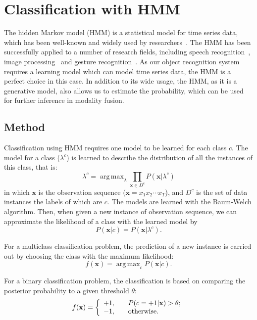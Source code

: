 \documentclass[letterpaper, 10 pt, conference]{ieeeconf}
\DeclareMathOperator*{\argmax}{arg\,max}
\begin{document}
\section{Classification with HMM}
The hidden Markov model (HMM) is a statistical model for time series data, which has been well-known and widely used by researchers~\cite{rabiner_tutorial_1989}\cite{rabiner_fundamentals_1993}. The HMM has been successfully applied to a number of research fields, including speech recognition~\cite{rabiner_fundamentals_1993}\cite{baker_dragon_1975}, image processing~\cite{chen_off-line_1994} and gesture recognition~\cite{mitra_gesture_2007}. As our object recognition system requires a learning model which can model time series data, the HMM is a perfect choice in this case. In addition to its wide usage, the HMM, as it is a generative model, also allows us to estimate the probability, which can be used for further inference in modality fusion.

\subsection{Method}
Classification using HMM requires one model to be learned for each class $c$. The model for a class ($\lambda^c$) is learned to describe the distribution of all the instances of this class, that is:
\begin{equation}
  \lambda^c = \argmax_{\lambda} \prod_{\mathbf{x} \in D^c} P(\mathbf{x}|\lambda^c)
\end{equation}
in which $\mathbf{x}$ is the observation sequence ($\mathbf{x} = x_1 x_2 \cdots x_T$), and $D^c$ is the set of data instances the labels of which are $c$. The models are learned with the Baum-Welch algorithm. Then, when given a new instance of observation sequence, we can approximate the likelihood of a class with the learned model by
\begin{equation}
  P(\mathbf{x}|c) = P(\mathbf{x}|\lambda^c) .
\end{equation}

For a multiclass classification problem, the prediction of a new instance is carried out by choosing the class with the maximum likelihood:
\begin{equation}
  \label{eq:classif_s}
  f(\mathbf{x}) = \argmax_{c} P(\mathbf{x}|c) .
\end{equation}

For a binary classification problem, the classification is based on comparing the posterior probability to a given threshold $\theta$:
\begin{equation}
  \label{eq:classif_g}
  f(\mathbf{x}) =
  \left\{ \begin{array}{l l} +1, & \quad P(c=+1|\mathbf{x}) > \theta; \\ -1, & \quad \text{otherwise.}
  \end{array} \right.
\end{equation}
\end{document}
